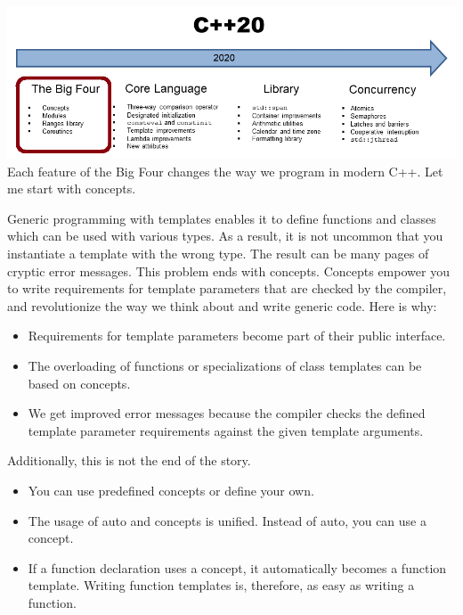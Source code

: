 


\begin{center}
\includegraphics[width=1.0\textwidth]{content/2/chapter3/images/2.png}\\
Each feature of the Big Four changes the way we program in modern C++. Let me start with concepts.
\end{center}


Generic programming with templates enables it to define functions and classes which can be used with various types. As a result, it is not uncommon that you instantiate a template with the wrong type. The result can be many pages of cryptic error messages. This problem ends with concepts. Concepts empower you to write requirements for template parameters that are checked by the compiler, and revolutionize the way we think about and write generic code. Here is why:

\begin{itemize}
\item 
Requirements for template parameters become part of their public interface.

\item 
The overloading of functions or specializations of class templates can be based on concepts.

\item 
We get improved error messages because the compiler checks the defined template parameter requirements against the given template arguments.
\end{itemize}

Additionally, this is not the end of the story.

\begin{itemize}
\item 
You can use predefined concepts or define your own.

\item 
The usage of auto and concepts is unified. Instead of auto, you can use a concept.

\item 
If a function declaration uses a concept, it automatically becomes a function template. Writing function templates is, therefore, as easy as writing a function.
\end{itemize}

